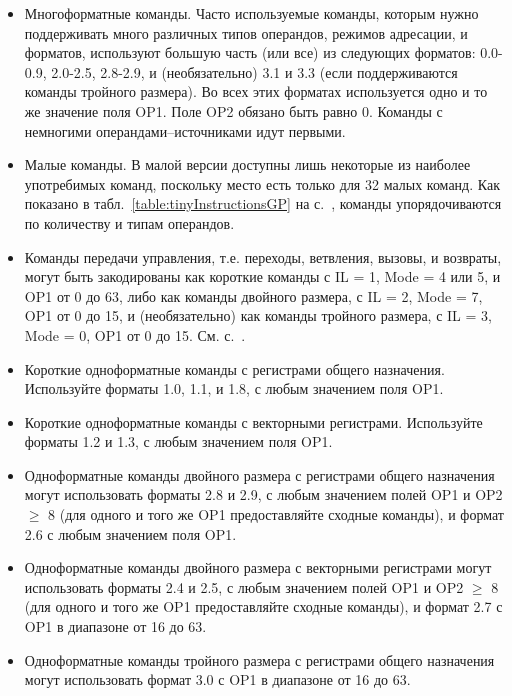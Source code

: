 \documentclass[forwardcom.tex]{subfiles}
\begin{document}
\begin{itemize}
\item Многоформатные команды. Часто используемые команды, которым нужно поддерживать много различных типов операндов, режимов адресации, и форматов, используют большую часть (или все) из следующих форматов: 0.0-0.9, 2.0-2.5, 2.8-2.9, и (необязательно) 3.1 и 3.3 (если поддерживаются команды тройного размера). Во всех этих форматах используется одно и то же значение поля OP1. Поле OP2 обязано быть равно 0. Команды с немногими операндами--источниками идут первыми.

\item Малые команды. В малой версии доступны лишь некоторые из наиболее употребимых команд, поскольку место есть только для 32 малых команд. Как показано в табл.~\ref{table:tinyInstructionsGP} на с.~\pageref{table:tinyInstructionsGP}, команды упорядочиваются по количеству и типам операндов.

\item Команды передачи управления, т.е. переходы, ветвления, вызовы, и возвраты, могут быть закодированы как короткие команды с IL = 1, Mode = 4 или 5, и
OP1 от 0 до 63, либо как команды двойного размера, с IL = 2, Mode = 7, OP1 от 0 до 15, и (необязательно) как команды тройного размера, с IL = 3, Mode = 0, 
OP1 от 0 до 15. См. с.~\pageref{table:jumpInstructionFormats}.

\item Короткие одноформатные команды с регистрами общего назначения. Используйте форматы 1.0, 1.1, и 1.8, с любым значением поля OP1.

\item Короткие одноформатные команды с векторными регистрами. Используйте форматы 1.2 и 1.3, с любым значением поля OP1.

\item Одноформатные команды двойного размера с регистрами общего назначения могут использовать форматы 2.8 и 2.9, с любым значением полей OP1 и OP2 $\geq$ 8 (для одного и того же OP1 предоставляйте сходные команды), и формат 2.6 с любым значением поля OP1.

\item Одноформатные команды двойного размера с векторными регистрами могут использовать форматы 2.4 и 2.5, с любым значением полей OP1 и OP2 $\geq$ 8 (для одного и того же OP1 предоставляйте сходные команды), и формат 2.7 с OP1 в диапазоне от 16 до 63.

\item Одноформатные команды тройного размера с регистрами общего назначения могут использовать формат 3.0 с OP1 в диапазоне от 16 до 63.


\end{itemize}
\end{document}
